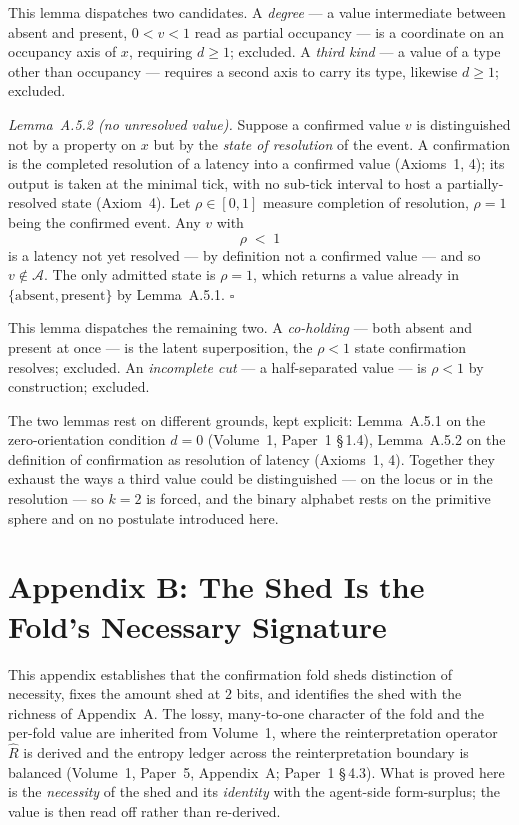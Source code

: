 \documentclass[11pt,oneside]{report}
\theoremstyle{definition}
\theoremstyle{remark}
\begin{document}
This lemma dispatches two candidates. A \emph{degree} --- a value intermediate between absent and
present, \ensuremath{0 < v < 1} read as partial occupancy --- is a coordinate on an occupancy axis
of \ensuremath{x}, requiring \ensuremath{d \geq 1}; excluded. A \emph{third kind} --- a value of a
type other than occupancy --- requires a second axis to carry its type, likewise \ensuremath{d \geq 1};
excluded.

\emph{Lemma~A.5.2 (no unresolved value).} Suppose a confirmed value \ensuremath{v} is distinguished
not by a property on \ensuremath{x} but by the \emph{state of resolution} of the event. A confirmation
is the completed resolution of a latency into a confirmed value (Axioms~1, 4); its output is taken
at the minimal tick, with no sub-tick interval to host a partially-resolved state (Axiom~4). Let
\ensuremath{\rho \in [0,1]} measure completion of resolution, \ensuremath{\rho = 1} being the
confirmed event. Any \ensuremath{v} with
\[
  \rho \;<\; 1
\]
is a latency not yet resolved --- by definition not a confirmed value --- and so \ensuremath{v \notin
\mathcal{A}}. The only admitted state is \ensuremath{\rho = 1}, which returns a value already in
\ensuremath{\{\text{absent}, \text{present}\}} by Lemma~A.5.1. \(\square\)

This lemma dispatches the remaining two. A \emph{co-holding} --- both absent and present at once ---
is the latent superposition, the \ensuremath{\rho < 1} state confirmation resolves; excluded. An
\emph{incomplete cut} --- a half-separated value --- is \ensuremath{\rho < 1} by construction;
excluded.

The two lemmas rest on different grounds, kept explicit: Lemma~A.5.1 on the zero-orientation
condition \ensuremath{d = 0} (Volume~1, Paper~1 \S\,1.4), Lemma~A.5.2 on the definition of confirmation
as resolution of latency (Axioms~1, 4). Together they exhaust the ways a third value could be
distinguished --- on the locus or in the resolution --- so \ensuremath{k = 2} is forced, and the
binary alphabet rests on the primitive sphere and on no postulate introduced here.
\section*{Appendix B: The Shed Is the Fold's Necessary Signature}

This appendix establishes that the confirmation fold sheds distinction of necessity, fixes the
amount shed at \ensuremath{2} bits, and identifies the shed with the richness of Appendix~A. The
lossy, many-to-one character of the fold and the per-fold value are inherited from Volume~1, where
the reinterpretation operator \ensuremath{\hat{R}} is derived and the entropy ledger across the
reinterpretation boundary is balanced (Volume~1, Paper~5, Appendix~A; Paper~1 \S\,4.3). What is
proved here is the \emph{necessity} of the shed and its \emph{identity} with the agent-side
form-surplus; the value is then read off rather than re-derived.
\end{document}
